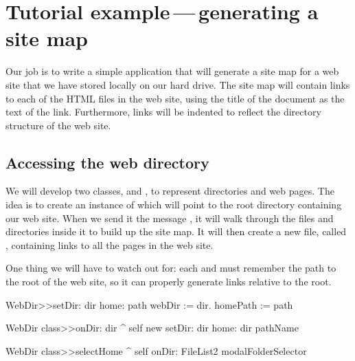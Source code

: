 \documentclass[a4paper,10pt,twoside]{book}
\begin{document}
\section{Tutorial example\,---\,generating a site map}


Our job is to write a simple application that will generate a site map for a web site that we have stored locally on our hard drive.  The site map will contain links to each of the HTML files in the web site, using the title of the document as the text of the link. Furthermore, links will be indented to reflect the directory structure of the web site.

\subsection{Accessing the web directory}


We will develop two classes,  and , to represent directories and web pages.  The idea is to create an instance of  which will point to the root directory containing our web site.  When we send it the message , it will walk through the files and directories inside it to build up the site map.  It will then create a new file, called , containing links to all the pages in the web site.

One thing we will have to watch out for: each  and  must remember the path to the root of the web site, so it can properly generate links relative to the root.


\begin{code}{}
WebDir>>setDir: dir home: path 
	webDir := dir.
	homePath := path

WebDir class>>onDir: dir
	^ self new setDir: dir home: dir pathName

WebDir class>>selectHome
	^ self onDir: FileList2 modalFolderSelector
\end{code}
\end{document}

